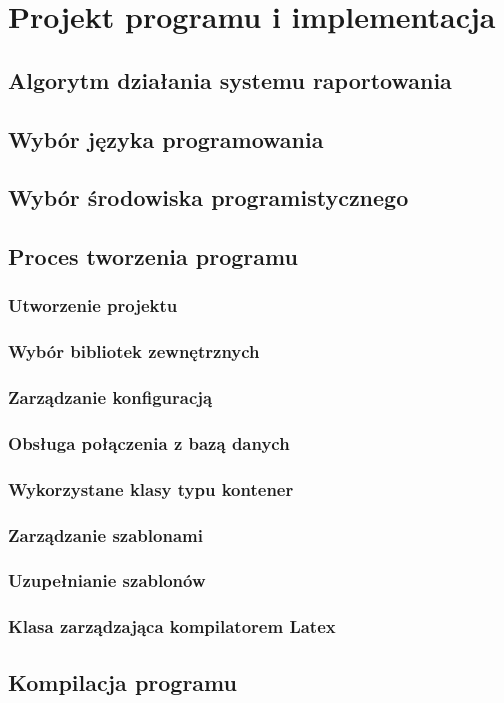 \chapter{Projekt programu i implementacja}

\section{Algorytm działania systemu raportowania}
\section{Wybór języka programowania}
\section{Wybór środowiska programistycznego}
\section{Proces tworzenia programu}
\subsection{Utworzenie projektu}
\subsection{Wybór bibliotek zewnętrznych}
\subsection{Zarządzanie konfiguracją}
\subsection{Obsługa połączenia z bazą danych}
\subsection{Wykorzystane klasy typu kontener}
\subsection{Zarządzanie szablonami}
\subsection{Uzupełnianie szablonów}
\subsection{Klasa zarządzająca kompilatorem Latex}
\section{ Kompilacja programu}
